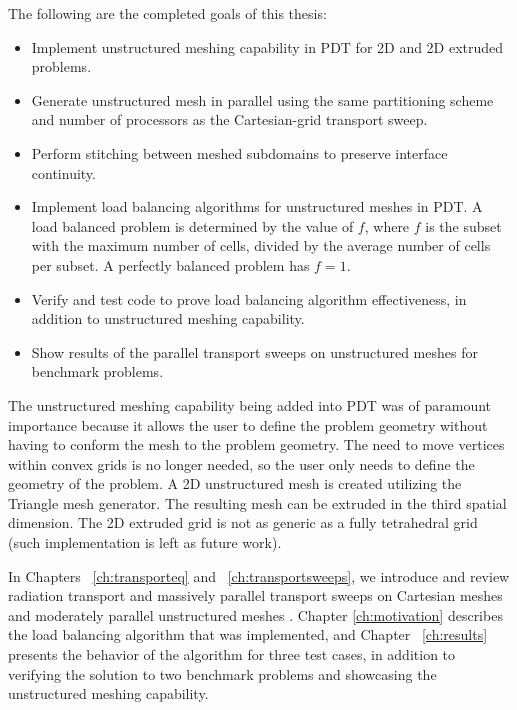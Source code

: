 The following are the completed goals of this thesis:
\begin{itemize}
\item Implement unstructured meshing capability in PDT for 2D and 2D extruded problems.
\item Generate unstructured mesh in parallel using the same partitioning scheme and number of processors as the Cartesian-grid transport sweep.
\item {Perform stitching between meshed subdomains to preserve interface continuity.}
\item Implement load balancing algorithms for unstructured meshes in PDT. A load balanced problem is determined by the value of $f$, where $f$ is the subset with the maximum number of cells, divided by the average number of cells per subset. A perfectly balanced problem has $f = 1$.
\item Verify and test code to prove load balancing algorithm effectiveness, in addition to unstructured meshing capability. 
\item Show results of the parallel transport sweeps on unstructured meshes for benchmark problems.
\end{itemize}

The unstructured meshing capability being added into PDT was of paramount importance because it allows the user to define the problem geometry without having to conform the mesh to the problem geometry. The need to move vertices within convex grids is no longer needed, so the user only needs to define the geometry of the problem. A 2D unstructured mesh is created utilizing the Triangle mesh generator. The resulting mesh can be extruded in the third spatial dimension. The 2D extruded grid is not as generic as a fully tetrahedral grid (such implementation is left as future work). 

In Chapters ~\ref{ch:transporteq} and ~\ref{ch:transportsweeps}, we introduce and review radiation transport and massively parallel transport sweeps on Cartesian meshes and moderately parallel unstructured meshes . Chapter \ref{ch:motivation} describes the load balancing algorithm that was implemented, and Chapter ~\ref{ch:results} presents the behavior of the algorithm for three test cases, in addition to verifying the solution to two benchmark problems and showcasing the unstructured meshing capability. 
